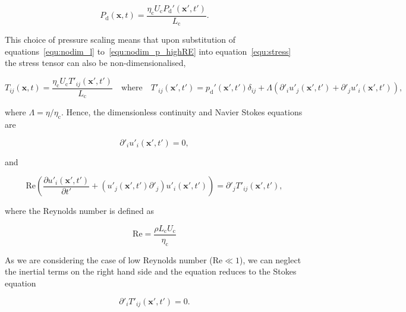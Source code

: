 \documentclass[12pt]{article}
\begin{document}
\begin{equation}
\label{equ:nodim_p_highRE}
P_{\text{d}}(\boldsymbol{x},t) = \frac{\eta_{\text{c}} U_{\text{c}} P_{\text{d}}'(\boldsymbol{x'},t')}{L_{\text{c}}} .
\end{equation}

This choice of pressure scaling means that upon substitution of equations~\ref{equ:nodim_l} to~\ref{equ:nodim_p_highRE} into equation~\ref{equ:stress} the stress tensor can also be non-dimensionalised,

\begin{equation}
\label{equ:nodim_T}
T_{ij}(\boldsymbol{x},t) = \frac{\eta_{\text{c}} U_{\text{c}} T'_{ij}(\boldsymbol{x'},t')}{L_{\text{c}}} \quad \text{where} \quad T'_{ij}(\boldsymbol{x'},t') = p_{\text{d}}'(\boldsymbol{x'},t') \delta_{ij} + \Lambda (\partial'_{i} u'_{j}(\boldsymbol{x'},t') + \partial'_{j} u'_{i}(\boldsymbol{x'},t')) ,
\end{equation}

where $\Lambda = \eta / \eta_{\text{c}}$. Hence, the dimensionless continuity and Navier Stokes equations are

\begin{equation}
\label{equ:nodim_cont}
\partial'_{i} u'_{i}(\boldsymbol{x'},t') = 0,
\end{equation}

and

\begin{equation}
\label{equ:NS_low_Reynolds}
\text{Re} \left(\frac{\partial u'_{i}(\boldsymbol{x'},t')}{\partial t'} + (u'_{j}(\boldsymbol{x'},t') \partial'_{j}) u'_{i}(\boldsymbol{x'},t') \right) = \partial'_{j} T'_{ij}(\boldsymbol{x'},t') ,
\end{equation}

where the Reynolds number is defined as

\begin{equation}
\label{equ:Reynolds}
\text{Re} = \frac{\rho L_{\text{c}} U_{\text{c}}}{\eta_{\text{c}}}
\end{equation}

As we are considering the case of low Reynolds number ($\text{Re} \ll 1$), we can neglect the inertial terms on the right hand side and the equation reduces to the Stokes equation \citep{Batchelor67, Kim05}

\begin{equation}
\label{equ:Stokes}
\partial'_{i} T'_{ij}(\boldsymbol{x'},t') = 0 .
\end{equation}
\end{document}
